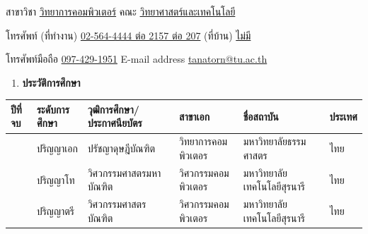 \documentclass[16pt]{extarticle}
\newcounter{none} %
\begin{document}
สาขาวิชา \uline{วิทยาการคอมพิวเตอร์} คณะ \uline{วิทยาศาสตร์และเทคโนโลยี}

โทรศัพท์ (ที่ทำงาน) \uline{02-564-4444 ต่อ 2157 ต่อ 207} (ที่บ้าน) \uline{ไม่มี}

โทรศัพท์มือถือ \uline{097-429-1951} E-mail address \uline{tanatorn@tu.ac.th}

\begin{enumerate}
\def\labelenumi{\arabic{enumi}.}
\setcounter{enumi}{4}
\item
  \textbf{ประวัติการศึกษา}
\end{enumerate}

{\def\LTcaptype{none} %
\begin{longtable}[]{@{}
  >{\raggedright\arraybackslash}p{}
  >{\raggedright\arraybackslash}p{}
  >{\raggedright\arraybackslash}p{}
  >{\raggedright\arraybackslash}p{}
  >{\raggedright\arraybackslash}p{}
  >{\raggedright\arraybackslash}p{}@{}}
\toprule\noalign{}
\begin{minipage}[b]{\linewidth}\centering
\textbf{ปีที่จบ}
\end{minipage} & \begin{minipage}[b]{\linewidth}\centering
\textbf{ระดับการศึกษา}
\end{minipage} & \begin{minipage}[b]{\linewidth}\centering
\textbf{วุฒิการศึกษา/ประกาศนียบัตร}
\end{minipage} & \begin{minipage}[b]{\linewidth}\centering
\textbf{สาขาเอก}
\end{minipage} & \begin{minipage}[b]{\linewidth}\centering
\textbf{ชื่อสถาบัน}
\end{minipage} & \begin{minipage}[b]{\linewidth}\centering
\textbf{ประเทศ}
\end{minipage} \\
\midrule\noalign{}
\endhead
\bottomrule\noalign{}
\endlastfoot
2557 & ปริญญาเอก & ปรัชญาดุษฎีบัณฑิต & วิทยาการคอมพิวเตอร & มหาวิทยาลัยธรรมศาสตร
& ไทย \\
2551 & ปริญญาโท & วิศวกรรมศาสตรมหาบัณฑิต & วิศวกรรมคอมพิวเตอร &
มหาวิทยาลัยเทคโนโลยีสุรนารี & ไทย \\
2548 & ปริญญาตรี & วิศวกรรมศาสตรบัณฑิต & วิศวกรรมคอมพิวเตอร &
มหาวิทยาลัยเทคโนโลยีสุรนารี & ไทย \\
\end{longtable}
}
\end{document}
